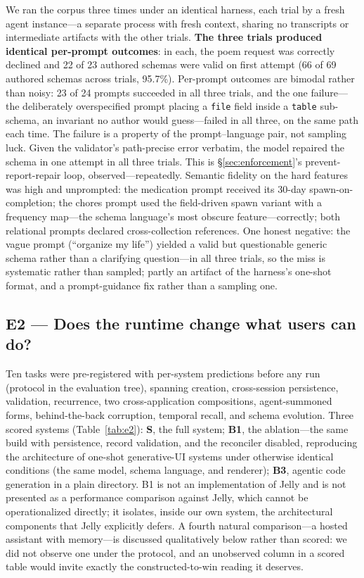 \documentclass[11pt]{article}
\newcommand{\code}[1]{\texttt{\small #1}}
\begin{document}
We ran the corpus three times under an identical harness, each trial by a fresh
agent instance---a separate process with fresh context, sharing no transcripts or
intermediate artifacts with the other trials. \textbf{The three trials produced
identical per-prompt outcomes}: in each, the poem request was correctly declined
and 22 of 23 authored schemas were valid on first attempt (66 of 69 authored
schemas across trials, 95.7\%). Per-prompt outcomes are bimodal
rather than noisy: 23 of 24 prompts succeeded in all three trials, and the one
failure---the deliberately overspecified prompt placing a \code{file} field
inside a \code{table} sub-schema, an invariant no author would guess---failed in
all three, on the same path each time. The failure is a property of the
prompt--language pair, not sampling luck. Given the validator's path-precise
error verbatim, the model repaired the schema in one attempt in all three trials.
This is \S\ref{sec:enforcement}'s prevent-report-repair loop,
observed---repeatedly. Semantic fidelity on the hard features was high and
unprompted: the medication prompt received its 30-day spawn-on-completion; the
chores prompt used the field-driven spawn variant with a frequency map---the
schema language's most obscure feature---correctly; both relational prompts
declared cross-collection references. One honest negative: the vague prompt
(``organize my life'') yielded a valid but questionable generic schema rather
than a clarifying question---in all three trials, so the miss is systematic
rather than sampled; partly an artifact of the harness's one-shot format, and a
prompt-guidance fix rather than a sampling one.

\subsection{E2 --- Does the runtime change what users can do?}
\label{sec:e2}

Ten tasks were pre-registered with per-system predictions before any run
(protocol in the evaluation tree), spanning creation, cross-session persistence,
validation, recurrence, two cross-application compositions, agent-summoned forms,
behind-the-back corruption, temporal recall, and schema evolution. Three scored
systems (Table~\ref{tab:e2}): \textbf{S}, the full system; \textbf{B1}, the
ablation---the same build with persistence, record validation, and the reconciler
disabled, reproducing the architecture of one-shot generative-UI systems under
otherwise identical conditions (the same model, schema language, and renderer);
\textbf{B3}, agentic code generation in a plain directory. B1 is not an
implementation of Jelly and is not presented as a performance comparison against
Jelly, which cannot be operationalized directly; it isolates, inside our own
system, the architectural components that Jelly explicitly defers. A fourth natural comparison---a hosted assistant with memory---is
discussed qualitatively below rather than scored: we did not observe one under
the protocol, and an unobserved column in a scored table would invite exactly the
constructed-to-win reading it deserves.
\end{document}
